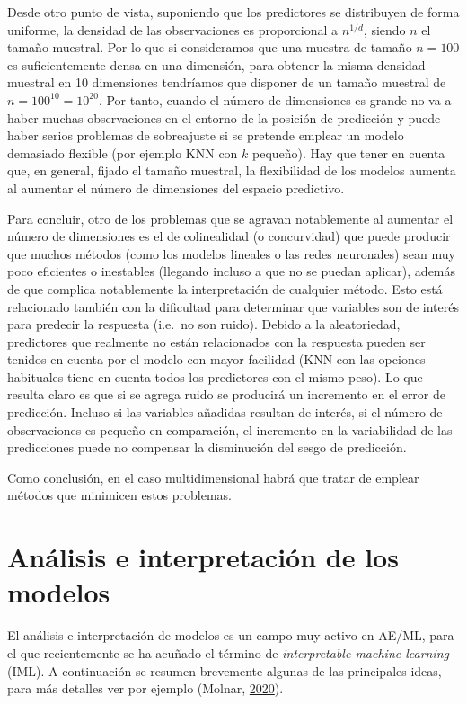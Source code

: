 \documentclass[
  spanish,
]{book}
\theoremstyle{break}
\theoremstyle{definition}
\theoremstyle{definition}
\theoremstyle{definition}
\theoremstyle{remark}
\begin{document}
Desde otro punto de vista, suponiendo que los predictores se distribuyen de forma uniforme, la densidad de las observaciones es proporcional a \(n^{1/d}\), siendo \(n\) el tamaño muestral.
Por lo que si consideramos que una muestra de tamaño \(n=100\) es suficientemente densa en una dimensión, para obtener la misma densidad muestral en 10 dimensiones tendríamos que disponer de un tamaño muestral de \(n = 100^{10} = 10^{20}\).
Por tanto, cuando el número de dimensiones es grande no va a haber muchas observaciones en el entorno de la posición de predicción y puede haber serios problemas de sobreajuste si se pretende emplear un modelo demasiado flexible (por ejemplo KNN con \(k\) pequeño). Hay que tener en cuenta que, en general, fijado el tamaño muestral, la flexibilidad de los modelos aumenta al aumentar el número de dimensiones del espacio predictivo.

Para concluir, otro de los problemas que se agravan notablemente al aumentar el número de dimensiones es el de colinealidad (o concurvidad) que puede producir que muchos métodos (como los modelos lineales o las redes neuronales) sean muy poco eficientes o inestables (llegando incluso a que no se puedan aplicar), además de que complica notablemente la interpretación de cualquier método.
Esto está relacionado también con la dificultad para determinar que variables son de interés para predecir la respuesta (i.e.~no son ruido).
Debido a la aleatoriedad, predictores que realmente no están relacionados con la respuesta pueden ser tenidos en cuenta por el modelo con mayor facilidad (KNN con las opciones habituales tiene en cuenta todos los predictores con el mismo peso).
Lo que resulta claro es que si se agrega ruido se producirá un incremento en el error de predicción.
Incluso si las variables añadidas resultan de interés, si el número de observaciones es pequeño en comparación, el incremento en la variabilidad de las predicciones puede no compensar la disminución del sesgo de predicción.

Como conclusión, en el caso multidimensional habrá que tratar de emplear métodos que minimicen estos problemas.

\hypertarget{analisis-modelos}{%
\section{Análisis e interpretación de los modelos}\label{analisis-modelos}}

El análisis e interpretación de modelos es un campo muy activo en AE/ML, para el que recientemente se ha acuñado el término de \emph{interpretable machine learning} (IML).
A continuación se resumen brevemente algunas de las principales ideas, para más detalles ver por ejemplo (Molnar, \protect\hyperlink{ref-molnar2020interpretable}{2020}).
\end{document}
